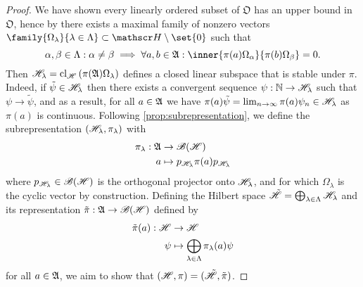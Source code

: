 \begin{proof}
    We have shown every linearly ordered subset of \(\mathfrak{O}\) has an upper bound in \(\mathfrak{O}\), hence by  there exists a maximal family of nonzero vectors \(\family{\Omega_{\lambda}}{\lambda \in \Lambda} \subset \hilbert \setminus \set{0}\) such that
    \begin{equation*}
        \alpha, \beta \in \Lambda : \alpha \neq \beta \implies \forall a, b \in \algebra{A} : \inner{\pi(a)\Omega_{\alpha}}{\pi(b)\Omega_{\beta}} = 0.
    \end{equation*}
    Then \(\mathscr{H}_{\lambda} = \operatorname{cl}_{\mathscr{H}}\left(\pi(\mathfrak{A})\Omega_{\lambda}\right)\) defines a closed linear subspace that is stable under \(\pi\). Indeed, if \(\tilde{\psi} \in \mathscr{H}_{\lambda}\) then there exists a convergent sequence \(\psi : \mathbb{N} \to \mathscr{H}_{\lambda}\) such that \(\psi \to \tilde{\psi}\), and as a result, for all \(a \in \mathfrak{A}\) we have \(\pi(a)\tilde{\psi} = \lim_{n\to\infty}{\pi(a)\psi_n} \in \mathscr{H}_{\lambda}\) as \(\pi(a)\) is continuous. Following \cref{prop:subrepresentation}, we define the subrepresentation \((\mathscr{H}_{\lambda}, \pi_{\lambda})\) with
    \begin{align*}
        \pi_{\lambda} : \mathfrak{A} &\to \mathscr{B}(\mathscr{H})\\
                                  a &\mapsto p_{\mathscr{H}_{\lambda}}\pi(a)p_{\mathscr{H}_{\lambda}}
    \end{align*}
    where \(p_{\mathscr{H}_{\lambda}} \in \mathscr{B}(\mathscr{H})\) is the orthogonal projector onto \(\mathscr{H}_{\lambda}\), and for which \(\Omega_\lambda\) is the cyclic vector by construction. Defining the Hilbert space \(\tilde{\mathscr{H}} = \bigoplus_{\lambda \in \Lambda} \mathscr{H}_\lambda\) and its representation \(\tilde{\pi} : \mathfrak{A} \to \mathscr{B}(\mathscr{H})\) defined by
    \begin{align*}
        \tilde{\pi}(a) : \mathscr{H} &\to \mathscr{H}\\
                             \psi &\mapsto \bigoplus_{\lambda \in \Lambda} \pi_{\lambda}(a)\psi
    \end{align*}
    for all \(a \in \mathfrak{A}\), we aim to show that \((\mathscr{H}, \pi) = (\tilde{\mathscr{H}}, \tilde{\pi})\).


\end{proof}
